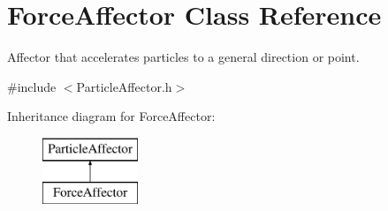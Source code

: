 \hypertarget{class_force_affector}{}\section{Force\+Affector Class Reference}
\label{class_force_affector}


Affector that accelerates particles to a general direction or point.  




{\ttfamily \#include $<$Particle\+Affector.\+h$>$}

Inheritance diagram for Force\+Affector\+:\begin{figure}[H]
\begin{center}
\leavevmode
\includegraphics[height=2.000000cm]{class_force_affector}
\end{center}
\end{figure}
